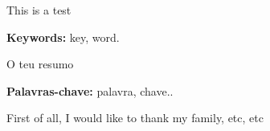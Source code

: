 


This is a test

\textbf{Keywords:} key, word.


O teu resumo

\textbf{Palavras-chave:} palavra, chave..



First of all, I would like to thank my family, etc, etc